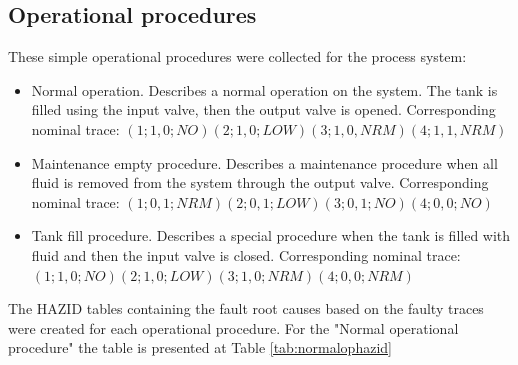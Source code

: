 \documentclass[conference]{IEEEtran}
\begin{document}
\subsection{Operational procedures}

These simple operational procedures were collected for the process system:
\begin{itemize}
\item Normal operation. Describes a normal operation on the system. The tank is filled using the input valve, then the output valve is opened. Corresponding nominal trace:
$(1;1,0;NO) (2;1,0;LOW) (3;1,0,NRM) (4;1,1,NRM)$
\item Maintenance empty procedure. Describes a maintenance procedure when all fluid is removed from the system through the output valve. Corresponding nominal trace:
$(1;0,1;NRM) (2;0,1;LOW) (3;0,1;NO) (4;0,0;NO)$
\item Tank fill procedure. Describes a special procedure when the tank is filled with fluid and then the input valve is closed. Corresponding nominal trace:
$(1;1,0;NO) (2;1,0;LOW) (3;1,0;NRM) (4;0,0;NRM)$
\end{itemize}

The HAZID tables containing the fault root causes based on the faulty traces were created for each operational procedure. For the "Normal operational procedure" the table is presented at Table \ref{tab:normalophazid}
\end{document}
